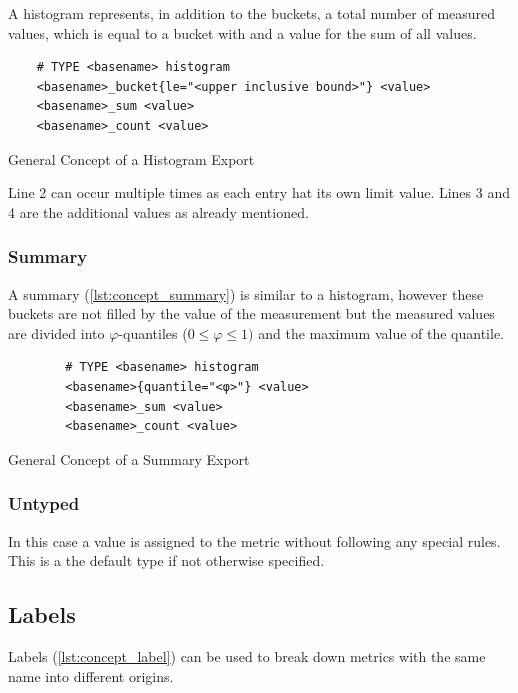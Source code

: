 A histogram represents, in addition to the buckets, a total number of measured values, which is equal to a bucket with  and a value for the sum of all values.

\begin{listing}[!ht]
	\begin{verbatim}
	# TYPE <basename> histogram
	<basename>_bucket{le="<upper inclusive bound>"} <value>
	<basename>_sum <value>
	<basename>_count <value>
	\end{verbatim}
	\caption{General Concept of a Histogram Export}
	\label{lst:concept_histogramm}
\end{listing}

Line 2 can occur multiple times as each entry hat its own limit value. Lines 3 and 4 are the additional values as already mentioned.

\subsubsection{Summary}

A summary (\cref{lst:concept_summary}) is similar to a histogram, however these buckets are not filled by the value of the measurement but the measured values are divided into $\varphi$-quantiles ($0 \le \varphi \le 1)$ and the maximum value of the quantile.

\begin{listing}[!ht]
	\begin{verbatim}
		# TYPE <basename> histogram
		<basename>{quantile="<φ>"} <value>
		<basename>_sum <value>
		<basename>_count <value>
	\end{verbatim}
	\caption{General Concept of a Summary Export}
	\label{lst:concept_summary}
\end{listing}

\subsubsection{Untyped}

In this case a value is assigned to the metric without following any special rules. This is a the default type if not otherwise specified.

\subsection{Labels}

Labels (\cref{lst:concept_label}) can be used to break down metrics with the same name into different origins. 

